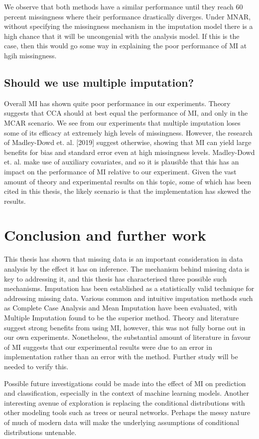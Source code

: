 \documentclass{article}
\begin{document}
	We observe that both methods have a similar performance until they reach 60 percent missingness where their performance drastically diverges. Under MNAR, without specifying the missingness mechanism in the imputation model there is a high chance that it will be uncongenial with the analysis model. If this is the case, then this would go some way in explaining the poor performance of MI at hgih missingness.
	
	
	\subsection{Should we use multiple imputation?}
	Overall MI has shown quite poor performance in our experiments. Theory suggests that CCA should at best equal the performance of MI, and only in the MCAR scenario. We see from our experiments that multiple imputation loses some of its efficacy at extremely high levels of missingness. However, the research of Madley-Dowd et. al. [2019] suggest otherwise, showing that MI can yield large benefits for bias and standard error even at high missingness levels.  Madley-Dowd et. al. make use of auxiliary covariates, and so it is plausible that this has an impact on the performance of MI relative to our experiment. Given the vast amount of theory and experimental results on this topic, some of which has been cited in this thesis, the likely scenario is that the implementation has skewed the results.
	 
	
	\section{Conclusion and further work}
	This thesis has shown that missing data is an important consideration in data analysis by the effect it has on inference. The mechanism behind missing data is key to addressing it, and this thesis has characterised three possible such mechanisms. Imputation has been established as a statistically valid technique for addressing missing data. Various common and intuitive imputation methods such as Complete Case Analysis and Mean Imputation have been evaluated, with Multiple Imputation found to be the superior method. Theory and literature suggest strong benefits from using MI, however, this was not fully borne out in our own experiments. Nonetheless, the substantial amount of literature in favour of MI suggests that our experimental results were due to an error in implementation rather than an error with the method. Further study will be needed to verify this.
	
	Possible future investigations could be made into the effect of MI on prediction and classification, especially in the context of machine learning models. Another interesting avenue of exploration is replacing the conditional distributions with other modeling tools such as trees or neural networks. Perhaps the messy nature of much of modern data will make the underlying assumptions of conditional distributions untenable.

		
	
	
\end{document}
